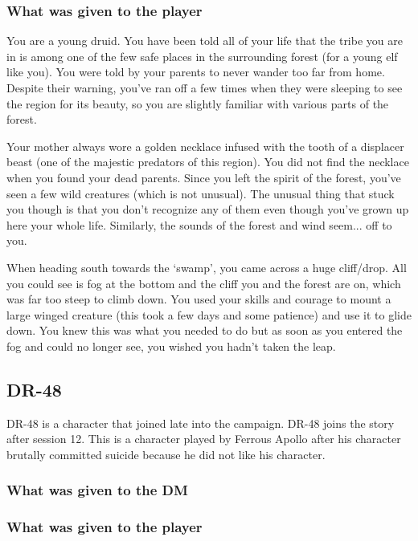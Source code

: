 \subsubsection{What was given to the player}

You are a young druid. You have been told all of your life that the tribe you are in is among one of the few safe places in the surrounding forest (for a young elf like you). You were told by your parents to never wander too far from home. Despite their warning, you've ran off a few times when they were sleeping to see the region for its beauty, so you are slightly familiar with various parts of the forest.

Your mother always wore a golden necklace infused with the tooth of a displacer beast (one of the majestic predators of this region). You did not find the necklace when you found your dead parents. Since you left the spirit of the forest, you've seen a few wild creatures (which is not unusual). The unusual thing that stuck you though is that you don't recognize any of them even though you've grown up here your whole life. Similarly, the sounds of the forest and wind seem... off to you. 

When heading south towards the `swamp', you came across a huge cliff/drop. All you could see is fog at the bottom and the cliff you and the forest are on, which was far too steep to climb down. You used your skills and courage to mount a large winged creature (this took a few days and some patience) and use it to glide down. You knew this was what you needed to do but as soon as you entered the fog and could no longer see, you wished you hadn't taken the leap.

\subsection{DR-48}

DR-48 is a character that joined late into the campaign. DR-48 joins the story after session 12. This is a character played by Ferrous Apollo after his character brutally committed suicide because he did not like his character.

\subsubsection{What was given to the DM}



\subsubsection{What was given to the player}



